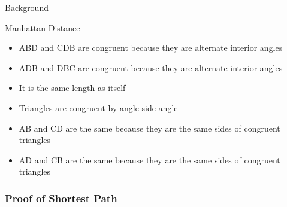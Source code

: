 \documentclass{beamer}
\theoremstyle{case}
\begin{document}
\begin{section}{Background}
\begin{subsection}{Manhattan Distance}
\begin{frame}
{\begin{itemize}
            \item ABD and CDB are congruent because they are alternate interior angles
            \item ADB and DBC are congruent because they are alternate interior angles
            \item It is the same length as itself
            \item Triangles are congruent by angle side angle
            \item AB and CD are the same because they are the same sides of congruent triangles
            \item AD and CB are the same because they are the same sides of congruent triangles
        \end{itemize}
    }
\end{frame}

\begin{frame}
    \frametitle{Proof of Shortest Path}
\end{frame}

\end{subsection} %


\end{section}
\end{document}
